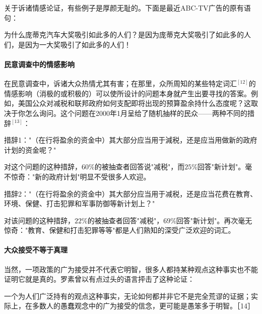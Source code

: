 关于诉诸情感论证，有些例子是厚颜无耻的。下面是最近ABC-TV广告的原有语句：

为什么庞蒂克汽车大奖吸引如此多的人们？是因为庞蒂克大奖吸引了如此多的人们，是因为一大奖吸引了如此多的人们！

\paragraph{民意调查中的情感影响}
在民意调查中，诉诸大众热情尤其有害；在那里，众所周知的某些特定词汇${ }^{[12]}$的情感影响（消极的或积极的）可以使所设计的问题本身就产生出要寻找的答案。例如，美国公众对减税和联邦政府如何支配即将出现的预算盈余持什么态度呢？这取决于你怎么询问。这个问题在2000年1月呈给了随机抽样的民众——两种不同的措辞${ }^{[13]}$：

措辞1："（在行将盈余的资金中）其大部分应当用于減税，还是应当用做新的政府计划的资金呢？"

对这个问题的这种措辞，60\%的被抽查者回答说"减税"，而$25\%$回答"新计划"。毫不惊奇："新的政府计划"明显不受很多人欢迎。

措辞2："（在行将盈余的资金中）其大部分应当用于减税，还是应当花费在教育、环境、保健、打击犯罪和军事防御等新计划上？"

对该问题的这种措辞，$22\%$的被抽查者回答"减税"，$69\%$回答"新计划"。再次毫无惊奇："教育、保健和打击犯罪等等"都是人们熟知的深受广泛欢迎的词汇。

\paragraph{大众接受不等于真理}
当然，一项政策的广为接受并不代表它明智，很多人都持某种观点这种事实也不能证明它就是真的。罗素曾以有点过头的语言抨击了这种论证：

一个为人们广泛持有的观点这种事实，无论如何都并非它不是完全荒谬的证据；实际上，在多数人的愚蠢观念中的广为接受的信念，更可能是愚笨多于明智。［14］